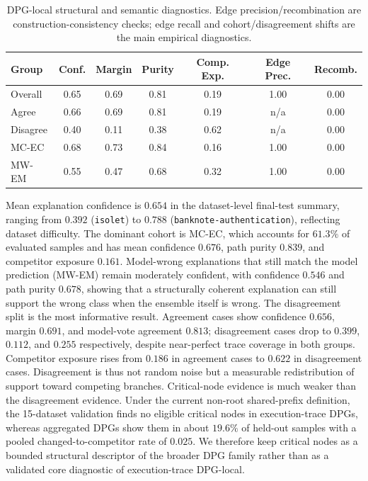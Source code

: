\documentclass[runningheads]{llncs}
\begin{document}
\begin{table}[ht!]
\centering
\small
\caption{DPG-local structural and semantic diagnostics. Edge precision/recombination are construction-consistency checks; edge recall and cohort/disagreement shifts are the main empirical diagnostics.}
\label{tab:dpg-structural}
\begin{tabular}{lcccccc}
\toprule
Group & Conf. & Margin & Purity & Comp. Exp. & Edge Prec. & Recomb. \\
\midrule
Overall  & 0.65 & 0.69 & 0.81 & 0.19 & 1.00 & 0.00 \\
Agree    & 0.66 & 0.69 & 0.81 & 0.19 & n/a  & 0.00 \\
Disagree & 0.40 & 0.11 & 0.38 & 0.62 & n/a  & 0.00 \\
MC-EC    & 0.68 & 0.73 & 0.84 & 0.16 & 1.00 & 0.00 \\
MW-EM    & 0.55 & 0.47 & 0.68 & 0.32 & 1.00 & 0.00 \\
\bottomrule
\end{tabular}
\end{table}

Mean explanation confidence is $0.654$ in the dataset-level final-test summary, ranging from $0.392$ (\texttt{isolet}) to $0.788$ (\texttt{banknote-authentication}), reflecting dataset difficulty. The dominant cohort is MC-EC, which accounts for $61.3\%$ of evaluated samples and has mean confidence $0.676$, path purity $0.839$, and competitor exposure $0.161$. Model-wrong explanations that still match the model prediction (MW-EM) remain moderately confident, with confidence $0.546$ and path purity $0.678$, showing that a structurally coherent explanation can still support the wrong class when the ensemble itself is wrong.
The disagreement split is the most informative result. Agreement cases show confidence $0.656$, margin $0.691$, and model-vote agreement $0.813$; disagreement cases drop to $0.399$, $0.112$, and $0.255$ respectively, despite near-perfect trace coverage in both groups. Competitor exposure rises from $0.186$ in agreement cases to $0.622$ in disagreement cases. Disagreement is thus not random noise but a measurable redistribution of support toward competing branches.
Critical-node evidence is much weaker than the disagreement evidence. Under the current non-root shared-prefix definition, the 15-dataset validation finds no eligible critical nodes in execution-trace DPGs, whereas aggregated DPGs show them in about $19.6\%$ of held-out samples with a pooled changed-to-competitor rate of $0.025$. We therefore keep critical nodes as a bounded structural descriptor of the broader DPG family rather than as a validated core diagnostic of execution-trace DPG-local.
\end{document}
